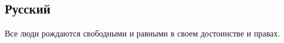 \documentclass[a4paper]{scrartcl}
\begin{document}
\subsection{Русский}
Все люди рождаются свободными и равными в своем достоинстве и
правах.
\end{document}
